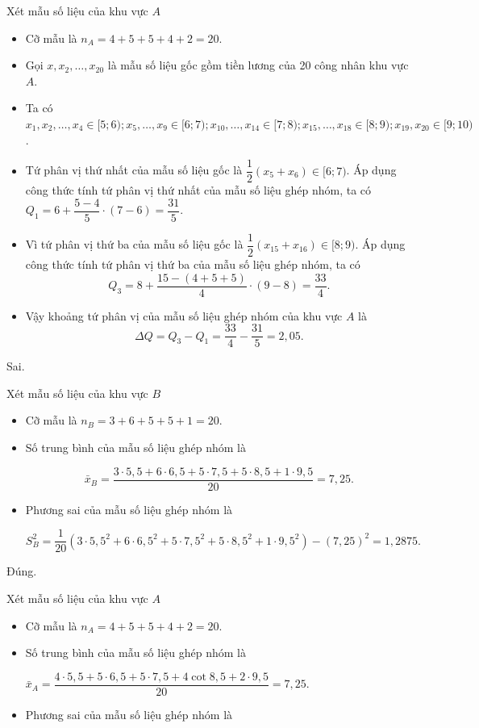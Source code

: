 \begin{ex}
{\begin{itemchoice}
			 Xét mẫu số liệu của khu vực $A$
			 \begin{itemize}
			 	\item 	Cỡ mẫu là $n_A=4+5+5+4+2=20$.
			 	\item 	Gọi $x, x_2, \ldots, x_{20}$ là mẫu số liệu gốc gồm tiền lương của 20 công nhân khu vực $A$.
			 	\item 	Ta có $x_1, x_2, \ldots, x_4 \in[5; 6); x_5, \ldots, x_9 \in[6; 7); x_{10}, \ldots, x_{14} \in[7; 8); x_{15}, \ldots, x_{18} \in[8; 9); x_{19}, x_{20} \in[9; 10)$.
			 	\item 	
			 Tứ phân vị thứ nhất của mẫu số liệu gốc là $\dfrac{1}{2}\left(x_5+x_6\right) \in[6; 7)$. 	Áp dụng công thức tính tứ phân vị thứ nhất của mẫu số liệu ghép nhóm, ta có $Q_1=6+\dfrac{5-4}{5} \cdot(7-6)=\dfrac{31}{5}$.
			 \item 	Vì tứ phân vị thứ ba của mẫu số liệu gốc là $\dfrac{1}{2}\left(x_{15}+x_{16}\right) \in[8; 9)$. Áp dụng công thức tính tứ phân vị thứ ba của mẫu số liệu ghép nhóm, ta có
			 		 $$
			 Q_3=8+\dfrac{15-(4+5+5)}{4} \cdot(9-8)=\dfrac{33}{4}.
			 $$	
			 \item 	Vậy khoảng tứ phân vị của mẫu số liệu ghép nhóm của khu vực $A$ là $$\Delta Q=Q_3-Q_1=\dfrac{33}{4}-\dfrac{31}{5}=2,05.$$
			 \end{itemize}
		
\itemch Sai.
	
		 Xét mẫu số liệu của khu vực $B$
	\begin{itemize}
		\item Cỡ mẫu là $n_B=3+6+5+5+1=20$.
		\item 	Số trung bình của mẫu số liệu ghép nhóm là
		
		$$
		\bar{x}_B=\dfrac{3\cdot 5{,}5+6\cdot 6{,}5+5\cdot 7{,}5+5\cdot 8{,}5+1\cdot 9{,}5}{20}=7{,}25.
		$$
		\item Phương sai của mẫu số liệu ghép nhóm là
		
		$S_B^2=\dfrac{1}{20}\left(3\cdot 5{,}5^2+6\cdot 6{,}5^2+5\cdot 7{,}5^2+5\cdot 8{,}5^2+1\cdot 9{,}5^2\right)-(7{,}25)^2=1{,}2875.$
	\end{itemize}	
\itemch Đúng.		
	
	 Xét mẫu số liệu của khu vực $A $
	\begin{itemize}
		\item 	Cỡ mẫu là $n_A=4+5+5+4+2=20$.
		\item 	Số trung bình của mẫu số liệu ghép nhóm là
		
		$\bar{x}_A=\dfrac{4\cdot 5{,}5+5\cdot 6{,}5+5\cdot 7{,}5+4\cot 8{,}5+2\cdot 9{,}5}{20}=7{,}25$.
		\item 	Phương sai của mẫu số liệu ghép nhóm là
		

\end{itemize}
\end{itemchoice}}
\end{ex}
